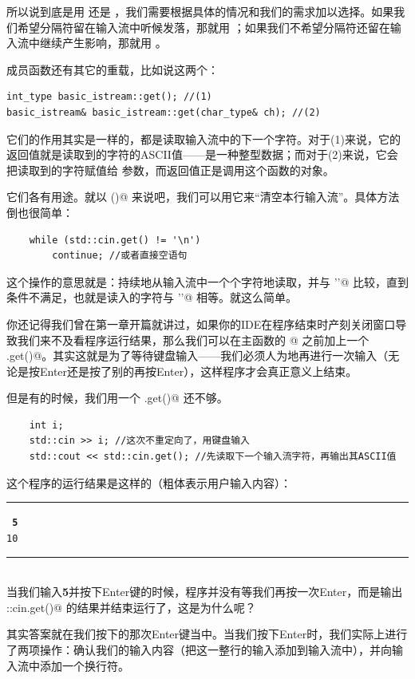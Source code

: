 所以说到底是用 \lstinline@getline@ 还是 \lstinline@get@，我们需要根据具体的情况和我们的需求加以选择。如果我们希望分隔符留在输入流中听候发落，那就用 \lstinline@get@；如果我们不希望分隔符还留在输入流中继续产生影响，那就用 \lstinline@getline@。\par
\lstinline@get@ 成员函数还有其它的重载，比如说这两个：
\begin{lstlisting}
int_type basic_istream::get(); //(1)
basic_istream& basic_istream::get(char_type& ch); //(2)
\end{lstlisting}\par
它们的作用其实是一样的，都是读取输入流中的下一个字符。对于(1)来说，它的返回值就是读取到的字符的ASCII值——是一种整型数据；而对于(2)来说，它会把读取到的字符赋值给 \lstinline@ch@ 参数，而返回值正是调用这个函数的对象。\par
它们各有用途。就以 \lstinline@get()@ 来说吧，我们可以用它来``清空本行输入流''。具体方法倒也很简单：
\begin{lstlisting}
    while (std::cin.get() != '\n')
        continue; //或者直接空语句
\end{lstlisting}
这个操作的意思就是：持续地从输入流中一个个字符地读取，并与 \lstinline@'\n'@ 比较，直到条件不满足，也就是读入的字符与 \lstinline@'\n'@ 相等。就这么简单。\par
你还记得我们曾在第一章开篇就讲过，如果你的IDE在程序结束时产刻关闭窗口导致我们来不及看程序运行结果，那么我们可以在主函数的 @ 之前加上一个 \lstinline@cin.get()@。其实这就是为了等待键盘输入——我们必须人为地再进行一次输入（无论是按Enter还是按了别的再按Enter），这样程序才会真正意义上结束。\par
但是有的时候，我们用一个 \lstinline@cin.get()@ 还不够。
\begin{lstlisting}
    int i;
    std::cin >> i; //这次不重定向了，用键盘输入
    std::cout << std::cin.get(); //先读取下一个输入流字符，再输出其ASCII值
\end{lstlisting}
这个程序的运行结果是这样的（粗体表示用户输入内容）：\\\noindent\rule{\linewidth}{.2pt}\texttt{
\textbf{5}\\
10
}\\\noindent\rule{\linewidth}{.2pt}\\
当我们输入\textbf{5}并按下Enter键的时候，程序并没有等我们再按一次Enter，而是输出 \lstinline@std::cin.get()@ 的结果并结束运行了，这是为什么呢？\par
其实答案就在我们按下的那次Enter键当中。当我们按下Enter时，我们实际上进行了两项操作：确认我们的输入内容（把这一整行的输入添加到输入流中），并向输入流中添加一个换行符。\par
